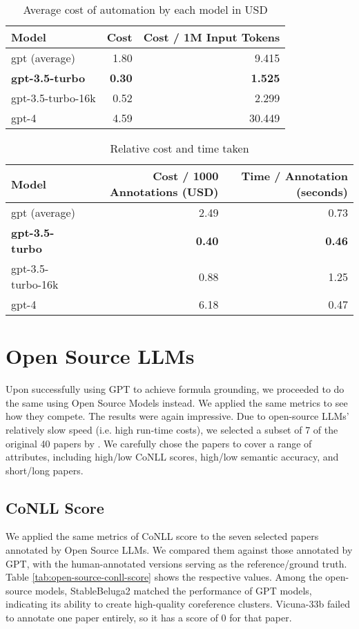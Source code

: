 \begin{table}[htpb]
  \centering
  \begin{tabular}{lrr}
    \hline
    Model & Cost & Cost / 1M Input Tokens \\
    \hline
    gpt (average) & 1.80 & 9.415 \\
    \textbf{gpt-3.5-turbo} & \textbf{0.30} & \textbf{1.525} \\
    gpt-3.5-turbo-16k & 0.52 & 2.299 \\
    gpt-4 & 4.59 & 30.449 \\
    \hline
  \end{tabular}
  \caption[Cost Analysis]{Average cost of automation by each model in USD}
  \label{tab:cost}
\end{table}

\begin{table}[htpb]
  \centering
  \begin{tabular}{lrr}
    \hline
    Model & Cost / 1000 Annotations (USD) & Time / Annotation (seconds) \\
    \hline
    gpt (average) & 2.49 & 0.73\\
    \textbf{gpt-3.5-turbo} & \textbf{0.40} & \textbf{0.46} \\
    gpt-3.5-turbo-16k & 0.88 & 1.25 \\
    gpt-4 & 6.18 & 0.47 \\
    \hline
  \end{tabular}
  \caption[Cost Analysis]{Relative cost and time taken}
  \label{tab:relative-cost}
\end{table}


\section{Open Source LLMs}
Upon successfully using GPT to achieve formula grounding, we proceeded to do the same using Open Source Models instead. We applied the same metrics to see how they compete. The results were again impressive. Due to open-source LLMs' relatively slow speed (i.e. high run-time costs), we selected a subset of 7 of the original 40 papers by \citet{asakura2022building}. We carefully chose the papers to cover a range of attributes, including high/low CoNLL scores, high/low semantic accuracy, and short/long papers.

\subsection{CoNLL Score}
We applied the same metrics of CoNLL score to the seven selected papers annotated by Open Source LLMs. We compared them against those annotated by GPT, with the human-annotated versions serving as the reference/ground truth. Table \ref{tab:open-source-conll-score} shows the respective values. Among the open-source models, StableBeluga2 matched the performance of GPT models, indicating its ability to create high-quality coreference clusters. Vicuna-33b failed to annotate one paper entirely, so it has a score of 0 for that paper.

